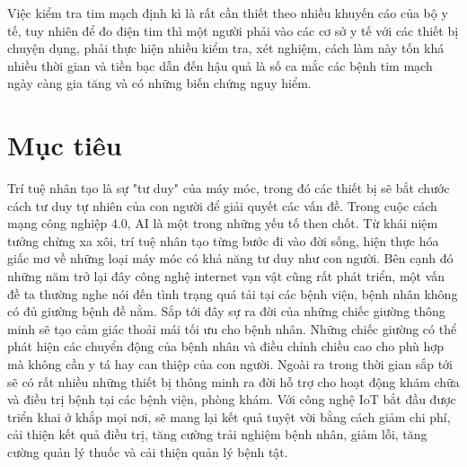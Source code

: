 Việc kiểm tra tim mạch định kì là rất cần thiết theo nhiều khuyến cáo của bộ y tế, tuy nhiên để đo điện tim thì một người phải vào các cơ sở y tế với các thiết bị chuyện dụng, phải thực hiện nhiều kiểm tra, xét nghiệm, cách làm này tốn khá nhiều thời gian và tiền bạc dẫn đến hậu quả là số ca mắc các bệnh tim mạch ngày càng gia tăng và có những biến chứng nguy hiểm.

\section{Mục tiêu}
Trí tuệ nhân tạo là sự "tư duy" của máy móc, trong đó các thiết bị sẽ bắt chước cách tư duy tự nhiên của con người để giải quyết các vấn đề. Trong cuộc cách mạng công nghiệp 4.0, AI là một trong những yếu tố then chốt. Từ khái niệm tưởng chừng xa xôi, trí tuệ nhân tạo từng bước đi vào đời sống, hiện thực hóa giấc mơ về những loại máy móc có khả năng tư duy như con người. Bên cạnh đó những năm trở lại đây công nghệ internet vạn vật cũng rất phát triển, một vấn đề ta thường nghe nói đến tình trạng quá tải tại các bệnh viện, bệnh nhân không có đủ giường bệnh đề nằm. Sắp tới đây sự ra đời của những chiếc giường thông minh sẽ tạo cảm giác thoải mái tối ưu cho bệnh nhân. Những chiếc giường có thể phát hiện các chuyển động của bệnh nhân và điều chỉnh chiều cao cho phù hợp mà không cần y tá hay can thiệp của con người. Ngoài ra trong thời gian sắp tới sẽ có rất nhiều những thiết bị thông minh ra đời hỗ trợ cho hoạt động khám chữa và điều trị bệnh tại các bệnh viện, phòng khám. Với công nghệ IoT bắt đầu được triển khai ở khắp mọi nơi, sẽ mang lại kết quả tuyệt vời bằng cách giảm chi phí, cải thiện kết quả điều trị, tăng cường trải nghiệm bệnh nhân, giảm lỗi, tăng cường quản lý thuốc và cải thiện quản lý bệnh tật.


